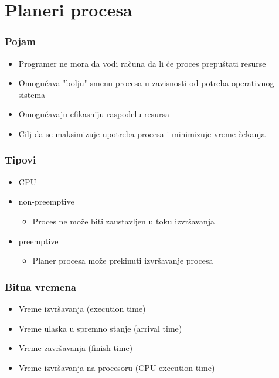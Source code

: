 \documentclass{beamer}
\begin{document}
\section*{Planeri procesa}
\begin{frame}
    \frametitle{Pojam}
    \begin{itemize}
        \item Programer ne mora da vodi računa da li će proces prepuštati resurse \newline
        \item Omogućava "bolju" smenu procesa u zavisnosti od potreba operativnog sistema \newline
        \item Omogućavaju efikasniju raspodelu resursa \newline
        \item Cilj da se maksimizuje upotreba procesa i minimizuje vreme čekanja
    \end{itemize}
\end{frame}

\begin{frame}
    \frametitle{Tipovi}
    \begin{itemize}
        \item CPU \newline
        \item non-preemptive \begin{itemize}
            \item Proces ne može biti zaustavljen u toku izvršavanja \newline
        \end{itemize}
        \item preemptive \begin{itemize}
            \item Planer procesa može prekinuti izvršavanje procesa
        \end{itemize}
    \end{itemize}
\end{frame}

\begin{frame}
    \frametitle{Bitna vremena}
    \begin{itemize}
        \item Vreme izvršavanja (execution time) \newline
        \item Vreme ulaska u spremno stanje (arrival time) \newline
        \item Vreme završavanja (finish time) \newline
        \item Vreme izvršavanja na procesoru (CPU execution time)
    \end{itemize}
\end{frame}
\end{document}
